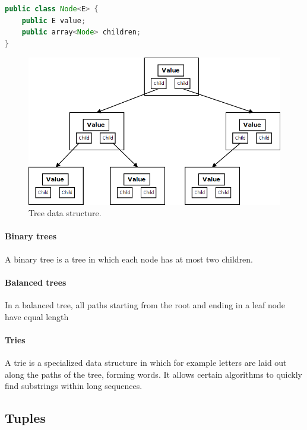 \begin{lstlisting}[language=java, caption=Node implementation for a standard tree., label=listing:node-doubly-linked-list]
public class Node<E> {
	public E value;
	public array<Node> children;
}
\end{lstlisting}

\begin{figure}[H]
	\begin{center}		
		\includegraphics[width=0.7\columnwidth]{img/programming-fundamentals/tree}
		\caption{Tree data structure.}
		\label{fig:tree}
	\end{center}
\end{figure}


\paragraph{Binary trees}

A binary tree is a tree in which each node has at most two children.


\paragraph{Balanced trees}

In a balanced tree, all paths starting from the root and ending in a leaf node have equal length


\paragraph{Tries}

A trie is a specialized data structure in which for example letters are laid out along the paths of the tree, forming words. It allows certain algorithms to quickly find substrings within long sequences.


\subsection{Tuples}

